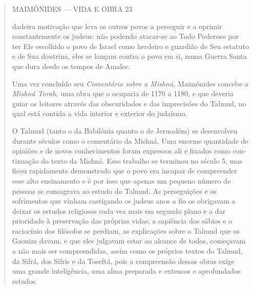 \begin{quote}
MAIMÔNIDES --- VIDA E OBRA 23

dadeira motivação que leva os outros povos a perseguir e a oprimir
constante­mente os judeus: não podendo atacar-se ao Todo Poderoso por
ter Ele escolhi­do o povo de Israel como herdeiro e guardião de Seu
estatuto e de Sua doutri­na, eles se lançam contra o povo em si, numa
Guerra Santa que dura desde os tempos de Amalec.

Uma vez concluído seu \emph{Comentário sobre a Mishná,} Maimônides
concebe a \emph{Mishná Torah,} uma obra que o ocuparia de 1170 a 1180, e
que de­veria guiar os leitores através das obscuridades e das
imprecisões do Talmud, no qual está contida a vida interior e exterior
do judaísmo.

O Talmud (tanto o da Babilônia quanto o de Jerusalém) se desenvol­veu
durante séculos como o comentário da Mishná. Uma enorme quantidade de
opiniões e de novos conhecimentos foram expressos ali e fixados como
con­tinuação do texto da Mishná. Esse trabalho se terminou no século 5,
mas ficou rapidamente demonstrado que o povo era incapaz de compreender
esse alto ensinamento e é por isso que apenas um pequeno número de
pessoas se consa­grava ao estudo do Talmud. As perseguições e os
sofrimentos que vinham cas­tigando os judeus anos a fio os obrigavam a
deixar os estudos religiosos cada vez mais em segundo plano e a dar
prioridade à preservação das próprias vidas; a sapiência dos sábios e o
raciocínio dos filósofos se perdiam, as explicações sobre o Talmud que
os Gaonim davam, e que eles julgavam estar ao alcance de todos,
começavam a não mais ser compreendidas, assim como os próprios textos do
Talmud, da Sifrá, dos Sifris e da Toseftá, pois a compreensão dessas
obras exige uma grande inteligência, uma alma preparada e extensos e
aprofun­dados estudos.


\end{quote}
